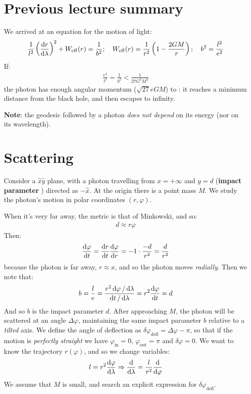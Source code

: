 \documentclass[../template.tex]{subfiles}
\begin{document}
\section{Previous lecture summary}
We arrived at an equation for the motion of light:
\begin{align*}
    \frac{1}{l^2}\left(\dv{r}{\lambda}\right)^2 + W_{\mathrm{eff} }(r) = \frac{1}{b^2}; \quad W_{\mathrm{eff} }(r) = \frac{1}{r^2} \left(1-\frac{2GM}{r} \right); \quad b^2 = \frac{l^2}{e^2}    
\end{align*}
If:
\begin{align*}
    \frac{e^2}{l^2} = \frac{1}{b^2} < \frac{1}{27 G^2M^2}   
\end{align*} 
the photon has enough angular momentum ($\sqrt{27} e GM$) to : it reaches a minimum distance from the black hole, and then escapes to infinity.

\begin{expl}
    \textbf{Note}: the geodesic followed by a photon \textit{does not depend} on its energy (nor on its wavelength).  
\end{expl}

\section{Scattering}
Consider a $\hat{x}\hat{y}$ plane, with a photon travelling from $x=+\infty$ and $y=d$ (\textbf{impact parameter} ) directed as $-\hat{x}$. At the origin there is a point mass $M$. We study the photon's motion in polar coordinates $(r, \varphi)$. 

When it's very far away, the metric is that of Minkowski, and so:
\begin{align*}
    d \approx r \varphi
\end{align*} 
Then:
\begin{align*}
    \dv{\varphi}{t} = \dv{r}{t} \dv{\varphi}{r} = -1 \cdot \frac{-d}{r^2} = \frac{d}{r^2}  
\end{align*}
because the photon is far away, $r \approx x$, and so the photon moves \textit{radially}. Then we note that:
\begin{align*}
    b = \frac{l}{e} =  \frac{r^2 \dd{\varphi}/\dd{\lambda}}{\dd{t} / \dd{\lambda}} = r^2 \dv{\varphi}{t} = d  
\end{align*}
And so $b$ is the impact parameter $d$. After approaching $M$, the photon will be scattered at an angle $\Delta \varphi$, maintaining the same impact parameter $b$ relative to a \textit{tilted} axis. We define the angle of deflection as $\delta\varphi_{\mathrm{defl} } = \Delta \varphi - \pi$, so that if the motion is \textit{perfectly straight} we have $\varphi_{\mathrm{in} } = 0$, $\varphi_\mathrm{out} = \pi$ and $\delta\varphi = 0$. We want to know the trajectory $r(\varphi)$, and so we change variables:
\begin{align*}
    l = r^2 \dv{\varphi}{\lambda} \Rightarrow \dv{\lambda} = \frac{l}{r^2} \dv{\varphi} 
\end{align*}        
We assume that $M$ is small, and search an explicit expression for $\delta\varphi_{\mathrm{defl} }$. 
\end{document}
